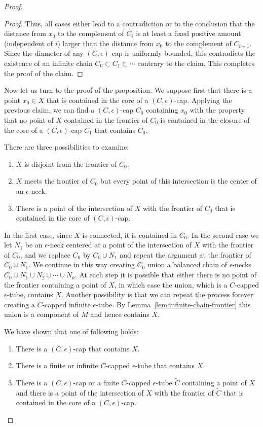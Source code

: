 \begin{proof}
\begin{proof}
Thus, all cases either lead to a contradiction or to the conclusion
that the distance from $x_0$ to the complement of $C_i$ is at least
a fixed positive amount (independent of $i$) larger than the
distance from $x_0$ to the complement of $C_{i-1}$.
 Since the diameter of any $(C,\epsilon)$-cap is
uniformly bounded, this contradicts the existence of an infinite
chain $C_0\subset C_1\subset \cdots$ contrary to the claim. This
completes the proof of the claim.
\end{proof}


Now let us turn to the proof of the proposition. We suppose first
that there is a point $x_0\in X$ that is contained in the core of a
$(C,\epsilon)$-cap. Applying the previous claim, we can find a
$(C,\epsilon)$-cap $C_0$ containing $x_0$ with the property that no
point of $X$ contained in the  frontier of $C_0$ is contained in the
closure of the core of a $(C,\epsilon)$-cap $C_1$ that contains
$C_0$.

There are three possibilities to examine:
\begin{enumerate}
\item[(i)] $X$ is disjoint from the frontier of $C_0$.
\item[(ii)] $X$ meets the frontier of $C_0$ but every point of this
intersection is the center of an $\epsilon$-neck.
\item[(iii)] There is a point of the intersection of $X$
with the frontier of $C_0$ that is contained in the core of
$(C,\epsilon)$-cap.
\end{enumerate}

In the first case, since $X$ is connected, it is contained in $C_0$.
In the second case we let $N_1$ be an $\epsilon$-neck centered at a
point of the intersection of $X$ with the frontier of $C_0$, and we
replace $C_0$ by $C_0\cup N_1$ and repeat the argument at the
frontier of $C_0\cup N_1$. We continue in this way creating $C_0$
union a balanced chain of $\epsilon$-necks $C_0\cup N_1\cup N_2\cup
\cdots\cup N_k$. At each step it is possible that either there is no
point of the frontier containing a point of $X$, in which case the
union, which is a $C$-capped $\epsilon$-tube, contains $X$. Another
possibility is that we can repeat the process forever creating a
$C$-capped infinite $\epsilon$-tube. By Lemma~\ref{lem:infinite-chain-frontier} this
union is a component of $M$ and hence contains $X$.

We have shown that one of following holds:
\begin{enumerate}
\item[(a)] There is a $(C,\epsilon)$-cap that contains $X$.
\item[(b)] There is a finite or infinite $C$-capped $\epsilon$-tube that
contains $X$.
\item[(c)] There is a $(C,\epsilon)$-cap or a finite $C$-capped
$\epsilon$-tube $\widetilde C$ containing a point of $X$ and there
is a point of the intersection of $X$ with the frontier of
$\widetilde C$ that is contained in the core of a
$(C,\epsilon)$-cap.
\end{enumerate}


\end{proof}
